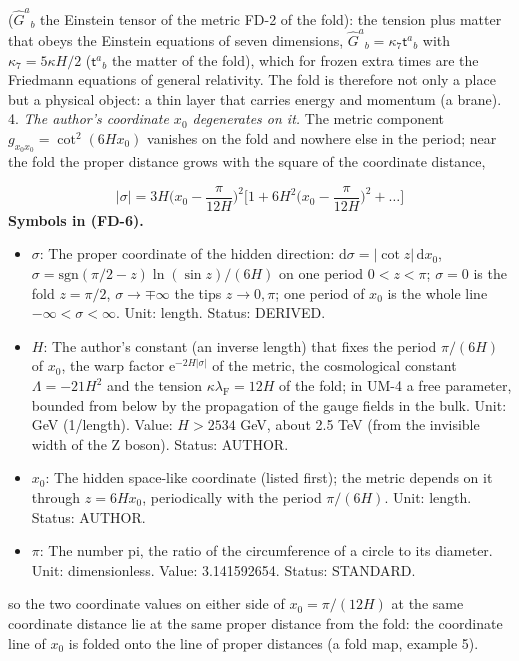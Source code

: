 \documentclass[
  10pt,
]{article}
\providecommand{\tightlist}{%
  \setlength{\itemsep}{0pt}\setlength{\parskip}{0pt}}
\begin{document}
(\(\hat G^a{}_b\) the Einstein tensor of the metric FD-2 of the fold):
the tension plus matter that obeys the Einstein equations of seven
dimensions, \(\hat G^a{}_b = \kappa_7\mathsf{t}^a{}_b\) with
\(\kappa_7 = 5\kappa H/2\) (\(\mathsf{t}^a{}_b\) the matter of the
fold), which for frozen extra times are the Friedmann equations of
general relativity. The fold is therefore not only a place but a
physical object: a thin layer that carries energy and momentum (a
brane). 4. \emph{The author's coordinate \(x_0\) degenerates on it.} The
metric component \(g_{x_0x_0} = \cot^2(6Hx_0)\) vanishes on the fold and
nowhere else in the period; near the fold the proper distance grows with
the square of the coordinate distance,

\[
\lvert\sigma\rvert = 3H\Big(x_0 - \frac{\pi}{12H}\Big)^2\Big[1 + 6H^2\Big(x_0 - \frac{\pi}{12H}\Big)^2 + \dots\Big] \tag{FD-6}
\] \textbf{Symbols in (FD-6).}

\begin{itemize}
\tightlist
\item
  \(\sigma\): The proper coordinate of the hidden direction:
  \(\mathrm{d}\sigma = \lvert\cot z\rvert\,\mathrm{d}x_0\),
  \(\sigma = \mathrm{sgn}(\pi/2 - z)\ln(\sin z)/(6H)\) on one period
  \(0 < z < \pi\); \(\sigma = 0\) is the fold \(z = \pi/2\),
  \(\sigma \to \mp\infty\) the tips \(z \to 0, \pi\); one period of
  \(x_0\) is the whole line \(-\infty < \sigma < \infty\). Unit: length.
  Status: DERIVED.
\item
  \(H\): The author's constant (an inverse length) that fixes the period
  \(\pi/(6H)\) of \(x_0\), the warp factor
  \(\mathrm{e}^{-2H\lvert\sigma\rvert}\) of the metric, the cosmological
  constant \(\Lambda = -21H^2\) and the tension
  \(\kappa\lambda_{\mathrm{F}} = 12H\) of the fold; in UM-4 a free
  parameter, bounded from below by the propagation of the gauge fields
  in the bulk. Unit: GeV (1/length). Value: \(H > 2534\) GeV, about 2.5
  TeV (from the invisible width of the Z boson). Status: AUTHOR.
\item
  \(x_0\): The hidden space-like coordinate (listed first); the metric
  depends on it through \(z = 6Hx_0\), periodically with the period
  \(\pi/(6H)\). Unit: length. Status: AUTHOR.
\item
  \(\pi\): The number pi, the ratio of the circumference of a circle to
  its diameter. Unit: dimensionless. Value: 3.141592654. Status:
  STANDARD.
\end{itemize}

so the two coordinate values on either side of \(x_0 = \pi/(12H)\) at
the same coordinate distance lie at the same proper distance from the
fold: the coordinate line of \(x_0\) is folded onto the line of proper
distances (a fold map, example 5).
\end{document}
